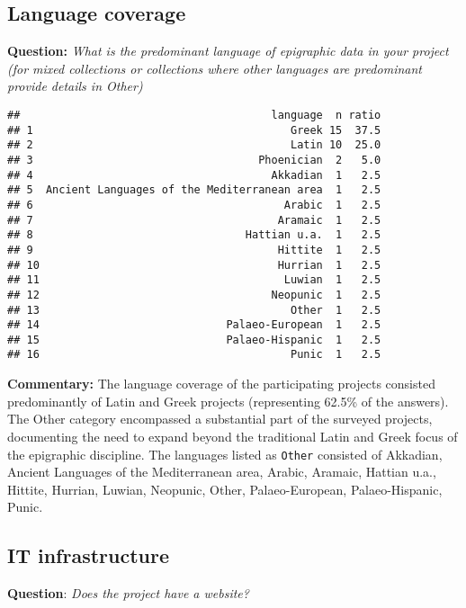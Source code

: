 \documentclass[
]{article}
\begin{document}
\hypertarget{language-coverage-1}{%
\subsection{Language coverage}\label{language-coverage-1}}

\textbf{Question:} \emph{What is the predominant language of epigraphic
data in your project (for mixed collections or collections where other
languages are predominant provide details in Other)}

\begin{verbatim}
##                                       language  n ratio
## 1                                        Greek 15  37.5
## 2                                        Latin 10  25.0
## 3                                   Phoenician  2   5.0
## 4                                     Akkadian  1   2.5
## 5  Ancient Languages of the Mediterranean area  1   2.5
## 6                                       Arabic  1   2.5
## 7                                      Aramaic  1   2.5
## 8                                 Hattian u.a.  1   2.5
## 9                                      Hittite  1   2.5
## 10                                     Hurrian  1   2.5
## 11                                      Luwian  1   2.5
## 12                                    Neopunic  1   2.5
## 13                                       Other  1   2.5
## 14                             Palaeo-European  1   2.5
## 15                             Palaeo-Hispanic  1   2.5
## 16                                       Punic  1   2.5
\end{verbatim}

\textbf{Commentary:} The language coverage of the participating projects
consisted predominantly of Latin and Greek projects (representing 62.5\%
of the answers). The Other category encompassed a substantial part of
the surveyed projects, documenting the need to expand beyond the
traditional Latin and Greek focus of the epigraphic discipline. The
languages listed as \texttt{Other} consisted of Akkadian, Ancient
Languages of the Mediterranean area, Arabic, Aramaic, Hattian u.a.,
Hittite, Hurrian, Luwian, Neopunic, Other, Palaeo-European,
Palaeo-Hispanic, Punic.

\hypertarget{it-infrastructure-1}{%
\subsection{IT infrastructure}\label{it-infrastructure-1}}

\textbf{Question}: \emph{Does the project have a website?}
\end{document}
